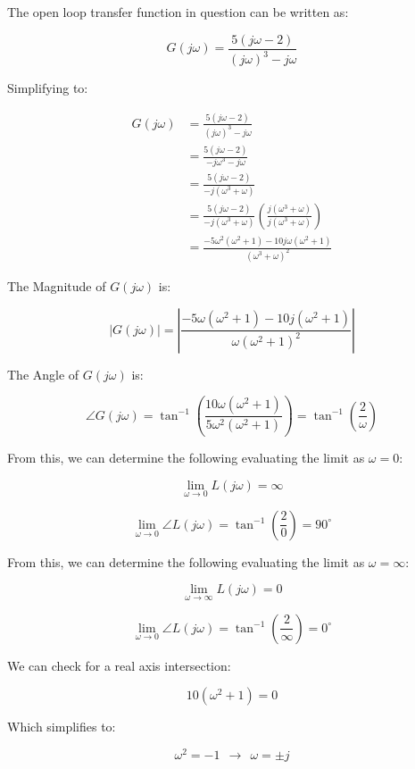 \documentclass[12pt, letterpaper]{../assignment}
\begin{document}
The open loop transfer function in question can be written as:

$$ G(j\omega) = \frac{5(j\omega-2)}{(j\omega)^3 - j\omega} $$

Simplifying to:

\begin{equation*}
    \begin{aligned}
        G(j\omega) &= \frac{5(j\omega-2)}{(j\omega)^3 - j\omega}\\
                   &= \frac{5(j\omega-2)}{-j \omega^3 - j\omega}\\
                   &= \frac{5(j\omega-2)}{-j (\omega^3 + \omega)}\\
                   &= \frac{5(j\omega-2)}{-j (\omega^3 + \omega)}
                      \left(\frac{j(\omega^3 + \omega)}{j(\omega^3 + \omega)}\right)\\
                   &= \frac{-5 \omega ^2 (\omega ^2 + 1) -10 j \omega (\omega ^2 + 1)}{(\omega^3 + \omega)^2}
    \end{aligned}
\end{equation*}

The Magnitude of $G(j\omega)$ is:

$$ |G(j\omega)| = \left|\frac{-5 \omega (\omega ^2 + 1) -10 j (\omega ^2 + 1)}{\omega(\omega^2 + 1)^2} \right| $$

The Angle of $G(j\omega)$ is:

$$ \angle G(j\omega) = \tan^{-1}\left( \frac{10 \omega (\omega ^2 + 1)}{5 \omega ^2 (\omega ^2 + 1)}\right) = \tan^{-1} \left(\frac{2}{\omega}\right) $$

From this, we can determine the following evaluating the limit as $\omega = 0$:

$$ \lim_{\omega \to 0} L(j\omega) = \infty   $$

$$ \lim_{\omega \to 0} \angle L(j\omega) = \tan^{-1} \left(\frac{2}{0}\right) = 90^\circ $$

From this, we can determine the following evaluating the limit as $\omega = \infty$:

$$ \lim_{\omega \to \infty} L(j\omega) = 0  $$

$$ \lim_{\omega \to 0} \angle L(j\omega) = \tan^{-1} \left(\frac{2}{\infty}\right) = 0^\circ $$

We can check for a real axis intersection:

$$ 10 (\omega ^2 + 1) = 0$$

Which simplifies to:

$$ \omega ^2 = -1 \ \ \rightarrow \ \ \omega = \pm j $$
\end{document}
